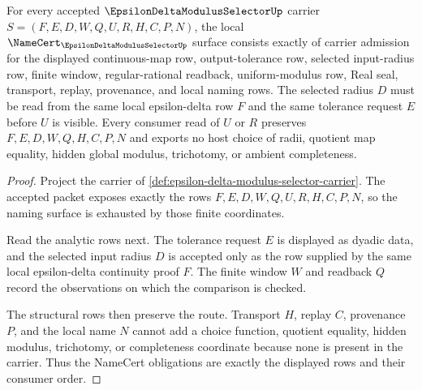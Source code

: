 \begin{theorem}
\label{thm:epsilon-delta-modulus-selector-namecert-obligations}
For every accepted $\EpsilonDeltaModulusSelectorUp$ carrier $S=(F,E,D,W,Q,U,R,H,C,P,N)$, the local $\NameCert_{\EpsilonDeltaModulusSelectorUp}$ surface consists exactly of carrier admission for the displayed continuous-map row, output-tolerance row, selected input-radius row, finite window, regular-rational readback, uniform-modulus row, Real seal, transport, replay, provenance, and local naming rows. The selected radius $D$ must be read from the same local epsilon-delta row $F$ and the same tolerance request $E$ before $U$ is visible. Every consumer read of $U$ or $R$ preserves $F,E,D,W,Q,H,C,P,N$ and exports no host choice of radii, quotient map equality, hidden global modulus, trichotomy, or ambient completeness.
\end{theorem}
\begin{proof}
Project the carrier of \autoref{def:epsilon-delta-modulus-selector-carrier}. The accepted packet exposes exactly the rows $F,E,D,W,Q,U,R,H,C,P,N$, so the naming surface is exhausted by those finite coordinates.

Read the analytic rows next. The tolerance request $E$ is displayed as dyadic data, and the selected input radius $D$ is accepted only as the row supplied by the same local epsilon-delta continuity proof $F$. The finite window $W$ and readback $Q$ record the observations on which the comparison is checked.

The structural rows then preserve the route. Transport $H$, replay $C$, provenance $P$, and the local name $N$ cannot add a choice function, quotient equality, hidden modulus, trichotomy, or completeness coordinate because none is present in the carrier. Thus the NameCert obligations are exactly the displayed rows and their consumer order.
\end{proof}

